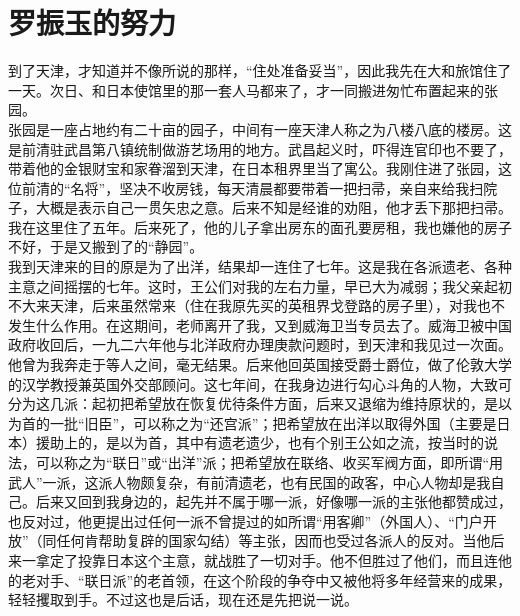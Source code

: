 \fancyhead[RO]{\thepage} %
\fancyhead[LE]{\thepage} %
\chapter*{罗振玉的努力}
到了天津，才知道并不像所说的那样，“住处准备妥当”，因此我先在大和旅馆住了一天。次日、和日本使馆里的那一套人马都来了，才一同搬进匆忙布置起来的张园。\\

张园是一座占地约有二十亩的园子，中间有一座天津人称之为八楼八底的楼房。这是前清驻武昌第八镇统制做游艺场用的地方。武昌起义时，吓得连官印也不要了，带着他的金银财宝和家眷溜到天津，在日本租界里当了寓公。我刚住进了张园，这位前清的“名将”，坚决不收房钱，每天清晨都要带着一把扫帚，亲自来给我扫院子，大概是表示自己一贯矢忠之意。后来不知是经谁的劝阻，他才丢下那把扫帚。我在这里住了五年。后来死了，他的儿子拿出房东的面孔要房租，我也嫌他的房子不好，于是又搬到了的“静园”。\\

我到天津来的目的原是为了出洋，结果却一连住了七年。这是我在各派遗老、各种主意之间摇摆的七年。这时，王公们对我的左右力量，早已大为减弱；我父亲起初不大来天津，后来虽然常来（住在我原先买的英租界戈登路的房子里），对我也不发生什么作用。在这期间，老师离开了我，又到威海卫当专员去了。威海卫被中国政府收回后，一九二六年他与北洋政府办理庚款问题时，到天津和我见过一次面。他曾为我奔走于等人之间，毫无结果。后来他回英国接受爵士爵位，做了伦敦大学的汉学教授兼英国外交部顾问。这七年间，在我身边进行勾心斗角的人物，大致可分为这几派：起初把希望放在恢复优待条件方面，后来又退缩为维持原状的，是以为首的一批“旧臣”，可以称之为“还宫派”；把希望放在出洋以取得外国（主要是日本）援助上的，是以为首，其中有遗老遗少，也有个别王公如之流，按当时的说法，可以称之为“联日”或“出洋”派；把希望放在联络、收买军阀方面，即所谓“用武人”一派，这派人物颇复杂，有前清遗老，也有民国的政客，中心人物却是我自己。后来又回到我身边的，起先并不属于哪一派，好像哪一派的主张他都赞成过，也反对过，他更提出过任何一派不曾提过的如所谓“用客卿”（外国人）、“门户开放”（同任何肯帮助复辟的国家勾结）等主张，因而也受过各派人的反对。当他后来一拿定了投靠日本这个主意，就战胜了一切对手。他不但胜过了他们，而且连他的老对手、“联日派”的老首领，在这个阶段的争夺中又被他将多年经营来的成果，轻轻攫取到手。不过这也是后话，现在还是先把说一说。\\

